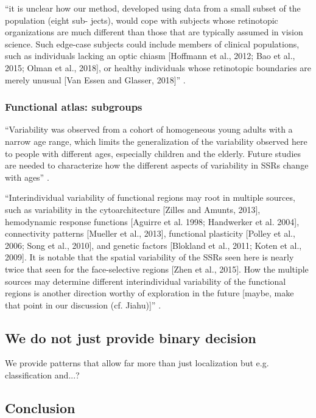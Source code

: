 ``it is unclear how our method, developed using data from a small subset of the
population (eight sub- jects), would cope with subjects whose retinotopic
organizations are much different than those that are typically assumed in vision
science. Such edge-case subjects could include members of clinical populations,
such as individuals lacking an optic chiasm [Hoffmann et al., 2012; Bao et al.,
2015; Olman et al., 2018], or healthy individuals whose retinotopic boundaries
are merely unusual [Van Essen and Glasser, 2018]'' \citep{benson2018bayesian}.


\subsubsection{Functional atlas: subgroups}

``Variability was observed from a cohort of homogeneous young adults with a
narrow age range, which limits the generalization of the variability observed
here to people with different ages, especially children and the elderly.
%
Future studies are needed to characterize how the different aspects of
variability in SSRs change with ages'' \citet{zhen2017quantifying}.

``Interindividual variability of functional regions may root in
multiple sources, such as variability in the cytoarchitecture [Zilles and
Amunts, 2013], hemodynamic response functions [Aguirre et al. 1998; Handwerker
et al. 2004], connectivity patterns [Mueller et al., 2013], functional
plasticity [Polley et al., 2006; Song et al., 2010], and genetic factors
[Blokland et al., 2011; Koten et al., 2009].
%
It is notable that the spatial variability of the SSRs seen here is nearly twice
that seen for the face-selective regions [Zhen et al., 2015]. How the multiple
sources may determine different interindividual variability of the functional
regions is another direction worthy of exploration in the future [maybe, make
that point in our discussion (cf. Jiahu)]'' \citep{zhen2017quantifying}.


\subsection{We do not just provide binary decision}
%
We provide patterns that allow far more than just localization but e.g.
classification and...?


\subsection{Conclusion}

